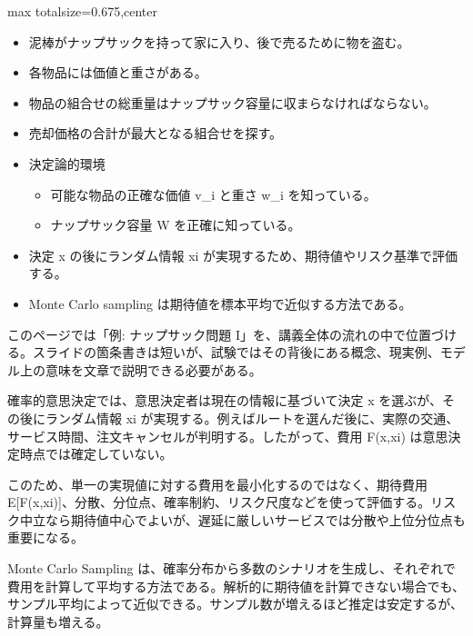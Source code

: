 \clearpage
{}
\begin{adjustbox}{max totalsize={\textwidth}{0.675\textheight},center}
\begin{minipage}{\textwidth}\scriptsize
\begin{minipage}[t]{0.485\textwidth}
\begin{itemize}
\item 泥棒がナップサックを持って家に入り、後で売るために物を盗む。
\item 各物品には価値と重さがある。
\item 物品の組合せの総重量はナップサック容量に収まらなければならない。
\item 売却価格の合計が最大となる組合せを探す。
\item 決定論的環境
\begin{itemize}
\item 可能な物品の正確な価値 v\_i と重さ w\_i を知っている。
\item ナップサック容量 W を正確に知っている。
\end{itemize}
\end{itemize}
\begin{itemize}
\item 決定 x の後にランダム情報 xi が実現するため、期待値やリスク基準で評価する。
\item Monte Carlo sampling は期待値を標本平均で近似する方法である。
\end{itemize}
\end{minipage}\hfill
\begin{minipage}[t]{0.485\textwidth}
このページでは「例: ナップサック問題 I」を、講義全体の流れの中で位置づける。スライドの箇条書きは短いが、試験ではその背後にある概念、現実例、モデル上の意味を文章で説明できる必要がある。\par
確率的意思決定では、意思決定者は現在の情報に基づいて決定 x を選ぶが、その後にランダム情報 xi が実現する。例えばルートを選んだ後に、実際の交通、サービス時間、注文キャンセルが判明する。したがって、費用 F(x,xi) は意思決定時点では確定していない。\par
このため、単一の実現値に対する費用を最小化するのではなく、期待費用 E[F(x,xi)]、分散、分位点、確率制約、リスク尺度などを使って評価する。リスク中立なら期待値中心でよいが、遅延に厳しいサービスでは分散や上位分位点も重要になる。\par
Monte Carlo Sampling は、確率分布から多数のシナリオを生成し、それぞれで費用を計算して平均する方法である。解析的に期待値を計算できない場合でも、サンプル平均によって近似できる。サンプル数が増えるほど推定は安定するが、計算量も増える。\par

\end{minipage}
\end{minipage}
\end{adjustbox}
